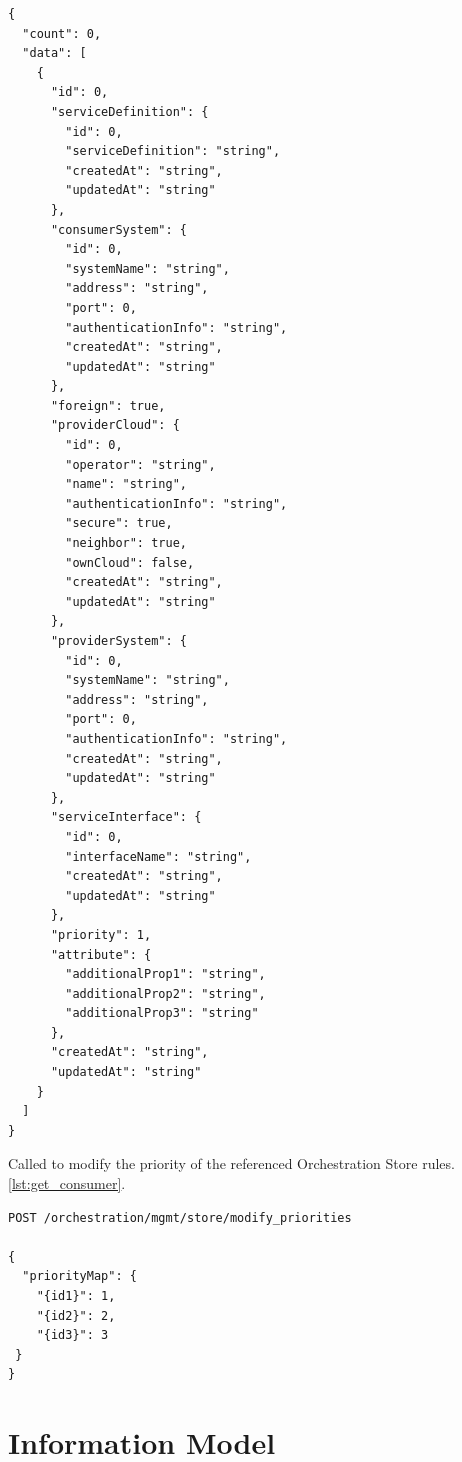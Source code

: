 \documentclass[a4paper]{arrowhead}
\newcommand{\fref}[1]{{\textcolor{ArrowheadBlue}{\hyperref[sec:functions:#1]{#1}}}}
\begin{document}
\begin{lstlisting}[language=http,label={lst:get_top_priority_res},caption={A \fref{Get an Intercloud rule by ID} response is an InterCloudRule}]
{
  "count": 0,
  "data": [
    {
      "id": 0,
      "serviceDefinition": {
        "id": 0,
        "serviceDefinition": "string",
        "createdAt": "string",
        "updatedAt": "string"
      },
      "consumerSystem": {
        "id": 0,
        "systemName": "string",
        "address": "string",
        "port": 0,
        "authenticationInfo": "string",
        "createdAt": "string",
        "updatedAt": "string"
      },
      "foreign": true,
      "providerCloud": {
        "id": 0,
        "operator": "string",
        "name": "string",
        "authenticationInfo": "string",
        "secure": true,
        "neighbor": true,
        "ownCloud": false,
        "createdAt": "string",
        "updatedAt": "string"
      },
      "providerSystem": {
        "id": 0,
        "systemName": "string",
        "address": "string",
        "port": 0,
        "authenticationInfo": "string",
        "createdAt": "string",
        "updatedAt": "string"
      },
      "serviceInterface": {
        "id": 0,
        "interfaceName": "string",
        "createdAt": "string",
        "updatedAt": "string"
      },
      "priority": 1,
      "attribute": {
        "additionalProp1": "string",
        "additionalProp2": "string",
        "additionalProp3": "string"
      },
      "createdAt": "string",
      "updatedAt": "string"
    }
  ]
}
\end{lstlisting}


Called to modify the priority of the referenced Orchestration Store rules. \ref{lst:get_consumer}.

\begin{lstlisting}[language=http,label={lst:modify_priorities},caption={A \fref{Get Entries by Consumer} invocation.}]
POST /orchestration/mgmt/store/modify_priorities

{
  "priorityMap": {
    "{id1}": 1,
    "{id2}": 2,
    "{id3}": 3
 }
}

\end{lstlisting}

\newpage

\section{Information Model}
\label{sec:model}
\end{document}
